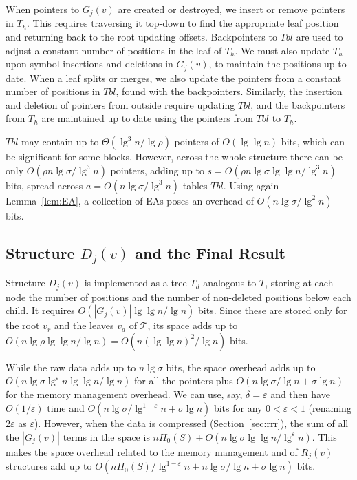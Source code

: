 \documentclass[11pt]{article}
\newcommand{\eps}{\varepsilon}
\begin{document}
When pointers to $G_j(v)$ are created or destroyed, we insert or remove
pointers in $T_h$. This requires traversing it top-down to find the appropriate
leaf position and returning back to the root updating offsets. Backpointers to
$Tbl$ are used to adjust a constant number of positions in the leaf of $T_h$.
We must also update $T_h$ upon symbol insertions and deletions in
$G_j(v)$, to maintain the positions up to date. When a leaf splits or merges,
we also update the pointers from a constant number of positions in
$Tbl$, found with the backpointers. Similarly, the insertion and deletion of
pointers from outside require updating $Tbl$, and the backpointers from $T_h$
are maintained up to date using the pointers from $Tbl$ to $T_h$.

$Tbl$ may contain up to $\Theta(\lg^3 n/\lg\rho)$ pointers of $O(\lg\lg n)$ 
bits, which can be significant for some blocks. However, across the whole
structure there can be only $O(\rho n\lg\sigma/\lg^3 n)$ pointers,
adding up to $s=O(\rho n\lg\sigma \lg\lg n/\lg^3 n)$ bits, spread across
$a=O(n\lg\sigma/\lg^3 n)$ tables $Tbl$. Using again Lemma~\ref{lem:EA},
a collection of EAs poses an overhead of $O(n\lg\sigma/\lg^2 n)$ bits.

\subsection{Structure $D_j(v)$ and the Final Result}

Structure $D_j(v)$ is implemented as a tree $T_d$ analogous to $T$, storing at 
each node the number 
of positions and the number of non-deleted positions below each child. It
requires $O(|G_j(v)|\lg\lg n / \lg n)$ bits. Since these are stored only for
the root $v_r$ and the leaves $v_a$ of $\mathcal{T}$, its space adds up to
$O(n\lg\rho \lg\lg n / \lg n) = O(n (\lg\lg n)^2/\lg n)$ bits.

While the raw data adds up to $n\lg\sigma$ bits, the space overhead adds up
to $O(n\lg\sigma \lg^\eps n\lg\lg n/\lg n)$ for all the pointers plus
$O(n\lg\sigma/\lg n+\sigma \lg n)$ for the memory management overhead. 
We can use, say, $\delta = \eps$ and then have $O(1/\eps)$ time and
$O(n\lg\sigma/\lg^{1-\eps} n+\sigma\lg n)$ bits for any 
$0<\eps<1$ (renaming $2\eps$ as $\eps$).
However, when the data is compressed (Section~\ref{sec:rrr}), the sum of all the
$|G_j(v)|$ terms in the space is $nH_0(S)+O(n\lg\sigma\lg\lg n/\lg^\eps n)$.
This makes the space overhead related to the memory management and of
$R_j(v)$ structures add up to $O(nH_0(S)/\lg^{1-\eps}n + n\lg\sigma/\lg n +
\sigma\lg n)$
bits.
\end{document}
